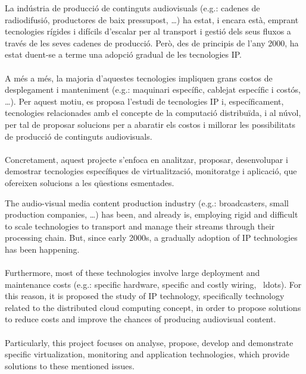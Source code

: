 \documentclass[english,final]{setup/eetac_tfc_pfc}
\begin{document}

\beforepreface  


\begin{resum}{10cm}
  La indústria de producció de continguts audiovisuals (e.g.: cadenes de radiodifusió, productores de baix pressupost, \ldots) ha estat, i encara està, emprant tecnologies rígides i difícils d'escalar per al transport i gestió dels seus fluxos a través de les seves cadenes de producció. Però, des de principis de l'any 2000, ha estat duent-se a terme una adopció gradual de les tecnologies IP.
  \\
  \\
  A més a més, la majoria d'aquestes tecnologies impliquen grans costos de desplegament i manteniment (e.g.: maquinari específic, cablejat específic i costós, \ldots). Per aquest motiu, es proposa l'estudi de tecnologies IP i, específicament, tecnologies relacionades amb el concepte de la computació distribuïda, i al núvol, per tal de proposar solucions per a abaratir els costos i millorar les possibilitats de producció de continguts audiovisuals.
  \\
  \\
  Concretament, aquest projecte s'enfoca en analitzar, proposar, desenvolupar i demostrar tecnologies específiques de virtualització, monitoratge i aplicació, que ofereixen solucions a les qüestions esmentades.
  
\end{resum}

\begin{overview}{11cm}
  The audio-visual media content production industry (e.g.: broadcasters, small production companies, \ldots) has been, and already is, employing rigid and difficult to scale technologies to transport and manage their streams through their processing chain. But, since early 2000s, a gradually adoption of IP technologies has been happening.
  \\
  \\
  Furthermore, most of these technologies involve large deployment and maintenance costs (e.g.: specific hardware, specific and costly wiring, \ ldots). For this reason, it is proposed the study of IP technology, specifically technology related to the distributed cloud computing concept, in order to propose solutions to reduce costs and improve the chances of producing audiovisual content.
  \\
  \\
  Particularly, this project focuses on analyse, propose, develop and demonstrate specific virtualization, monitoring and application technologies, which provide solutions to these mentioned issues.     

\end{overview}
\end{document}
